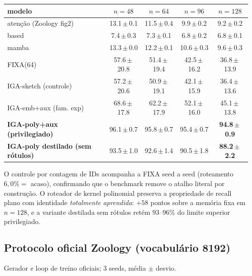 \documentclass[11pt]{article}
\begin{document}
\begin{table}[h]\centering
\begin{tabular}{lcccc}
\toprule
modelo & $n{=}48$ & $n{=}64$ & $n{=}96$ & $n{=}128$ \\
\midrule
aten\c{c}\~ao (Zoology fig2) & 13.1\,$\pm$\,0.1 & 11.5\,$\pm$\,0.4 & 9.9\,$\pm$\,0.2 & 9.2\,$\pm$\,0.2 \\
based                     & 7.4\,$\pm$\,0.3  & 7.3\,$\pm$\,0.1  & 6.8\,$\pm$\,0.2 & 6.8\,$\pm$\,0.1 \\
mamba                    & 13.3\,$\pm$\,0.0 & 12.2\,$\pm$\,0.1 & 10.6\,$\pm$\,0.3 & 9.6\,$\pm$\,0.3 \\
FIXA(64)                 & 57.6\,$\pm$\,20.8 & 51.4\,$\pm$\,19.4 & 42.5\,$\pm$\,16.2 & 36.8\,$\pm$\,13.9 \\
IGA-sketch (controle)     & 57.2\,$\pm$\,20.6 & 50.9\,$\pm$\,19.1 & 42.1\,$\pm$\,15.9 & 36.4\,$\pm$\,13.6 \\
IGA-emb+aux (fam. exp)    & 68.6\,$\pm$\,17.8 & 62.2\,$\pm$\,17.9 & 52.1\,$\pm$\,16.0 & 45.1\,$\pm$\,13.8 \\
\textbf{IGA-poly+aux (privilegiado)}        & 96.1\,$\pm$\,0.7 & 95.8\,$\pm$\,0.7 & 95.4\,$\pm$\,0.7 & \textbf{94.8\,$\pm$\,0.9} \\
\textbf{IGA-poly destilado (sem r\'otulos)}   & 93.5\,$\pm$\,1.0 & 92.6\,$\pm$\,1.4 & 90.5\,$\pm$\,1.8 & \textbf{88.2\,$\pm$\,2.2} \\
\bottomrule
\end{tabular}
\end{table}

O controle por contagem de IDs acompanha a FIXA seed a seed (roteamento
$6{,}0\%=$ acaso), confirmando que o benchmark remove o atalho literal por
constru\c{c}\~ao. O roteador de kernel polinomial preserva a propriedade de recall
plano com identidade \emph{totalmente aprendida}: $+58$ pontos sobre a
mem\'oria fixa em $n=128$, e a variante destilada sem r\'otulos ret\'em
$93$--$96\%$ do limite superior privilegiado.

\subsection{Protocolo oficial Zoology (vocabul\'ario 8192)}

Gerador e loop de treino oficiais; 3 seeds, m\'edia $\pm$ desvio.
\end{document}
